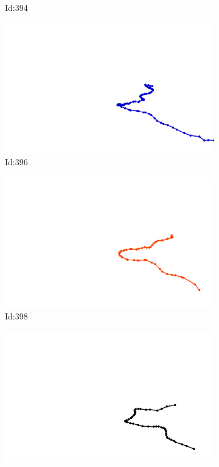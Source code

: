 \documentclass[12pt,twoside]{report}
\begin{document}
\begin{figure}
\begin{subfigure}[b]{0.20\textwidth}
\caption{Id:394}
\end{subfigure}
\begin{subfigure}[b]{0.20\textwidth}
\centering
\includegraphics[width=\textwidth]{../trajectories/396.png}
\caption{Id:396}
\end{subfigure}
\begin{subfigure}[b]{0.20\textwidth}
\centering
\includegraphics[width=\textwidth]{../trajectories/398.png}
\caption{Id:398}
\end{subfigure}
\begin{subfigure}[b]{0.20\textwidth}
\centering
\includegraphics[width=\textwidth]{../trajectories/399.png}

\end{subfigure}
\end{figure}
\end{document}
